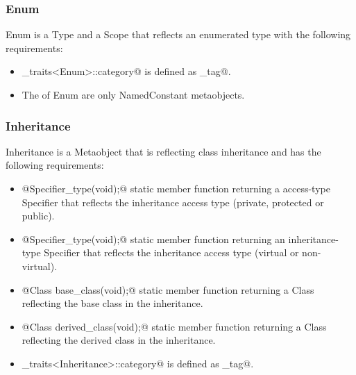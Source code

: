 \subsubsection{Enum}

{\metaobject Enum} is a {\metaobject Type} and a {\metaobject Scope} that reflects an enumerated
type with the following requirements:

\begin{itemize}
	\item \verb@metaobject_traits<Enum>::category@ is defined as \verb@enum_tag@.

	\item The \verb@members@ of {\metaobject Enum} are only {\metaobject NamedConstant} metaobjects.
\end{itemize}

\subsubsection{Inheritance}

{\metaobject Inheritance} is a {\metaobject Metaobject} that is reflecting class inheritance and has
the following requirements:

\begin{itemize}
	\item{\verb@static @{\metaobject Specifier}\verb@access_type(void);@} static member function
	returning a access-type {\metaobject Specifier} that reflects the inheritance access type
	(private, protected or public).

	\item{\verb@static @{\metaobject Specifier}\verb@inheritance_type(void);@} static member function
	returning an inheritance-type {\metaobject Specifier} that reflects the inheritance access type
	(virtual or non-virtual).

	\item{\verb@static @{\metaobject Class} \verb@ base_class(void);@} static member function
	returning a {\metaobject Class} reflecting the base class in the inheritance.

	\item{\verb@static @{\metaobject Class} \verb@ derived_class(void);@} static member function
	returning a {\metaobject Class} reflecting the derived class in the inheritance.

	\item \verb@metaobject_traits<Inheritance>::category@ is defined as \verb@inheritance_tag@.
\end{itemize}

